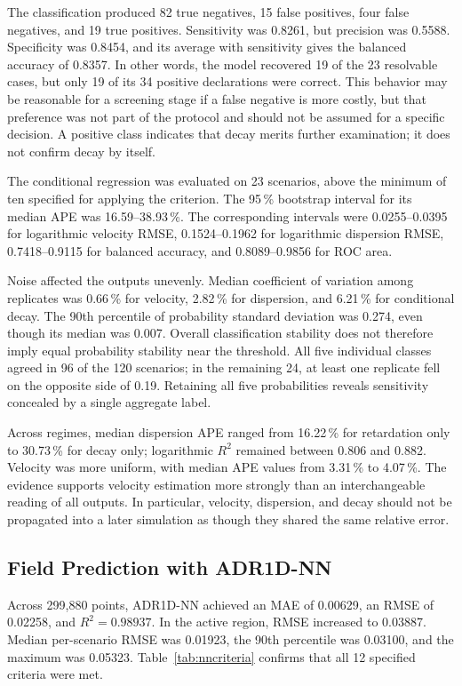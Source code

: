 \documentclass[11pt,a4paper]{article}
\begin{document}
The classification produced 82 true negatives, 15 false positives, four false
negatives, and 19 true positives. Sensitivity was 0.8261, but precision was
0.5588. Specificity was 0.8454, and its average with sensitivity gives the
balanced accuracy of 0.8357. In other words, the model recovered 19 of the 23
resolvable cases, but only 19 of its 34 positive declarations were correct.
This behavior may be reasonable for a screening stage if a false negative is
more costly, but that preference was not part of the protocol and should not be
assumed for a specific decision. A positive class indicates that decay merits
further examination; it does not confirm decay by itself.

The conditional regression was evaluated on 23 scenarios, above the minimum of
ten specified for applying the criterion. The 95\,\% bootstrap interval for its
median APE was 16.59--38.93\,\%. The corresponding intervals were
0.0255--0.0395 for logarithmic velocity RMSE, 0.1524--0.1962 for logarithmic
dispersion RMSE, 0.7418--0.9115 for balanced accuracy, and 0.8089--0.9856 for
ROC area.

Noise affected the outputs unevenly. Median coefficient of variation among
replicates was 0.66\,\% for velocity, 2.82\,\% for dispersion, and 6.21\,\% for
conditional decay. The 90th percentile of probability standard deviation was
0.274, even though its median was 0.007. Overall classification stability does
not therefore imply equal probability stability near the threshold. All five
individual classes agreed in 96 of the 120 scenarios; in the remaining 24, at
least one replicate fell on the opposite side of 0.19. Retaining all five
probabilities reveals sensitivity concealed by a single aggregate label.

Across regimes, median dispersion APE ranged from 16.22\,\% for retardation
only to 30.73\,\% for decay only; logarithmic $R^2$ remained between 0.806 and
0.882. Velocity was more uniform, with median APE values from 3.31\,\% to
4.07\,\%. The evidence supports velocity estimation more strongly than an
interchangeable reading of all outputs. In particular, velocity, dispersion,
and decay should not be propagated into a later simulation as though they
shared the same relative error.

\subsection{Field Prediction with ADR1D-NN}

Across 299,880 points, ADR1D-NN achieved an MAE of 0.00629, an RMSE of 0.02258,
and $R^2=0.98937$. In the active region, RMSE increased to 0.03887. Median
per-scenario RMSE was 0.01923, the 90th percentile was 0.03100, and the maximum
was 0.05323. Table~\ref{tab:nncriteria} confirms that all 12 specified criteria
were met.
\end{document}

